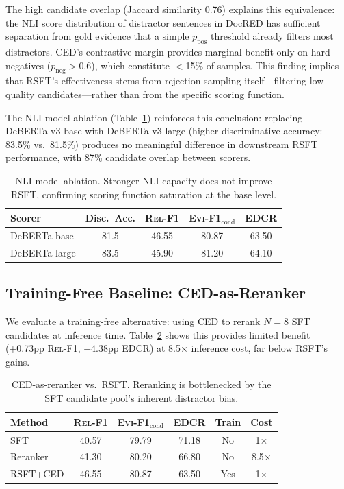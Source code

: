 \documentclass[11pt,a4paper]{article}
\newcommand{\evi}{\textsc{Evi-F1}}
\newcommand{\edcr}{\textsc{EDCR}}
\newcommand{\relf}{\textsc{Rel-F1}}
\begin{document}
The high candidate overlap (Jaccard similarity 0.76) explains this equivalence: the NLI score distribution of distractor sentences in DocRED has sufficient separation from gold evidence that a simple $p_\text{pos}$ threshold already filters most distractors. CED's contrastive margin provides marginal benefit only on hard negatives ($p_\text{neg}{>}0.6$), which constitute $<$15\% of samples. This finding implies that RSFT's effectiveness stems from rejection sampling itself---filtering low-quality candidates---rather than from the specific scoring function.

The NLI model ablation (Table~\ref{tab:nli_ablation}) reinforces this conclusion: replacing DeBERTa-v3-base with DeBERTa-v3-large (higher discriminative accuracy: 83.5\% vs.\ 81.5\%) produces no meaningful difference in downstream RSFT performance, with 87\% candidate overlap between scorers.

\begin{table}[t]
\centering
\small
\begin{tabular}{lcccc}
\toprule
\textbf{Scorer} & \textbf{Disc.\ Acc.} & \textbf{\relf{}} & \textbf{\evi{}$_\text{cond}$} & \textbf{\edcr{}} \\
\midrule
DeBERTa-base & 81.5 & 46.55 & 80.87 & 63.50 \\
DeBERTa-large & 83.5 & 45.90 & 81.20 & 64.10 \\
\bottomrule
\end{tabular}
\caption{NLI model ablation. Stronger NLI capacity does not improve RSFT, confirming scoring function saturation at the base level.}
\label{tab:nli_ablation}
\end{table}

\subsection{Training-Free Baseline: CED-as-Reranker}
\label{sec:reranker}

We evaluate a training-free alternative: using CED to rerank $N{=}8$ SFT candidates at inference time. Table~\ref{tab:reranker} shows this provides limited benefit (+0.73pp \relf{}, $-4.38$pp \edcr{}) at 8.5$\times$ inference cost, far below RSFT's gains.

\begin{table}[t]
\centering
\small
\begin{tabular}{lccccc}
\toprule
\textbf{Method} & \textbf{\relf{}} & \textbf{\evi{}$_\text{cond}$} & \textbf{\edcr{}} & \textbf{Train} & \textbf{Cost} \\
\midrule
SFT & 40.57 & 79.79 & 71.18 & No & 1$\times$ \\
Reranker & 41.30 & 80.20 & 66.80 & No & 8.5$\times$ \\
RSFT+CED & 46.55 & 80.87 & 63.50 & Yes & 1$\times$ \\
\bottomrule
\end{tabular}
\caption{CED-as-reranker vs.\ RSFT. Reranking is bottlenecked by the SFT candidate pool's inherent distractor bias.}
\label{tab:reranker}
\end{table}
\end{document}

